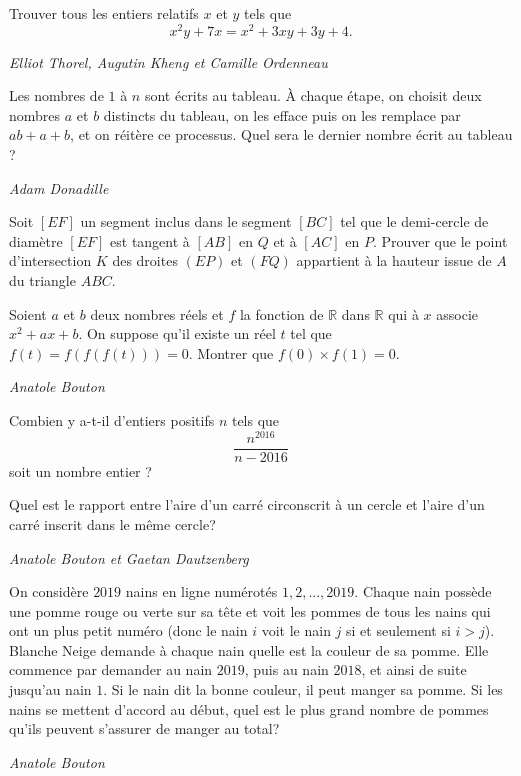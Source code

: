 \begin{exo}{}
Trouver tous les entiers relatifs $x$ et $y$ tels que \[x^2y+7x=x^2+3xy+3y+4.\]

\medskip
\textit{Elliot Thorel, Augutin Kheng et Camille Ordenneau}
\end{exo}

\begin{exo}{}
Les nombres de $1$ à $n$ sont écrits au tableau. \`A chaque étape, on choisit deux nombres $a$ et $b$ distincts du tableau, on les efface puis on les remplace par $ab+a+b$, et on réitère ce processus. Quel sera le dernier nombre écrit au tableau ?

\medskip
\textit{Adam Donadille}
\end{exo}

\begin{exo}{}Soit $[EF]$ un segment inclus dans le segment $[BC]$ tel que le demi-cercle de diamètre $[EF]$ est tangent à $[AB]$ en $Q$ et à $[AC]$ en $P$. Prouver que le point d'intersection $K$ des droites $(EP)$ et $(FQ)$ appartient à la hauteur issue de $A$ du triangle $ABC$.
\end{exo}

\begin{exo}{}
Soient $a$ et $b$ deux nombres réels et $f$ la fonction de $\mathbb{R}$ dans $\mathbb{R}$ qui à $x$ associe $x^2+ax+b$. On suppose  qu'il existe un réel $t$ tel que $f(t)=f(f(f(t)))=0$. Montrer que $f(0) \times f(1)=0$.

\medskip
\textit{Anatole Bouton}
\end{exo}

\begin{exo}{}
Combien y a-t-il d'entiers positifs $n$ tels que
\[\frac{n^{2016}}{n-2016}\]
soit un nombre entier ?
\end{exo}

\begin{exo}{}
Quel est le rapport entre l'aire d'un carré circonscrit à un cercle et l'aire d'un carré inscrit dans le même cercle?

\medskip
\textit{Anatole Bouton et Gaetan Dautzenberg}
\end{exo}

\begin{exo}{}
On considère $2019$ nains en ligne numérotés $1,2,...,2019$. Chaque nain possède une pomme rouge ou verte sur sa tête et voit les pommes de tous les nains qui ont un plus petit numéro (donc le nain $i$ voit le nain $j$ si et seulement si $i>j$). Blanche Neige demande à chaque nain quelle est la couleur de sa pomme. Elle commence par demander au nain $2019$, puis au nain $2018$, et ainsi de suite jusqu'au nain $1$. Si le nain dit la bonne couleur, il peut manger sa pomme. Si les nains se mettent d'accord au début, quel est le plus grand nombre de pommes qu'ils peuvent s'assurer de manger au total?

\medskip
\textit{Anatole Bouton}

\end{exo}

